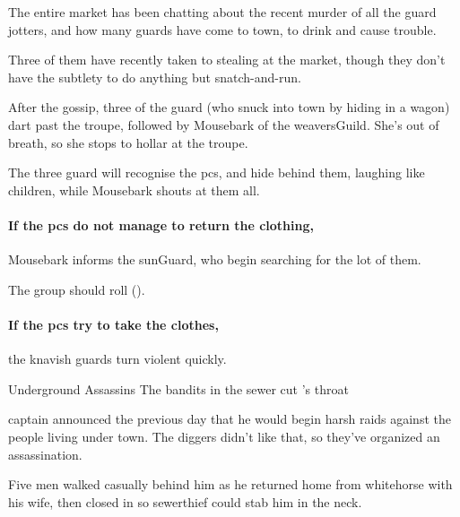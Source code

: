\begin{exampletext}
  The entire market has been chatting about the recent murder of all the \gls{guard} \glspl{jotter}, and how many \glspl{guard} have come to town, to drink and cause trouble.

  Three of them have recently taken to stealing at the market, though they don't have the subtlety to do anything but snatch-and-run.
\end{exampletext}

After the gossip, three of the \gls{guard} (who snuck into town by hiding in a wagon) dart past the troupe, followed by Mousebark of the \gls{weaversGuild}.
She's out of breath, so she stops to hollar at the troupe.

The three \gls{guard} will recognise the \glspl{pc}, and hide behind them, laughing like children, while Mousebark shouts at them all.


\paragraph{If the \glspl{pc} do not manage to return the clothing,}
Mousebark informs the \gls{sunGuard}, who begin searching for the lot of them.

The group should roll  (\tn[8]).

\paragraph{If the \glspl{pc} try to take the clothes,}
the knavish \glspl{guard} turn violent quickly.


{Underground Assassins}%
{The bandits in the sewer cut 's throat}%

\begin{exampletext}
  \Gls{captain} announced the previous day that he would begin harsh raids against the people living under \gls{town}.
  The \glspl{digger} didn't like that, so they've organized an assassination.

  Five men walked casually behind him as he returned home from \gls{whitehorse} with his wife, then closed in so \gls{sewerthief} could stab him in the neck.
\end{exampletext}

